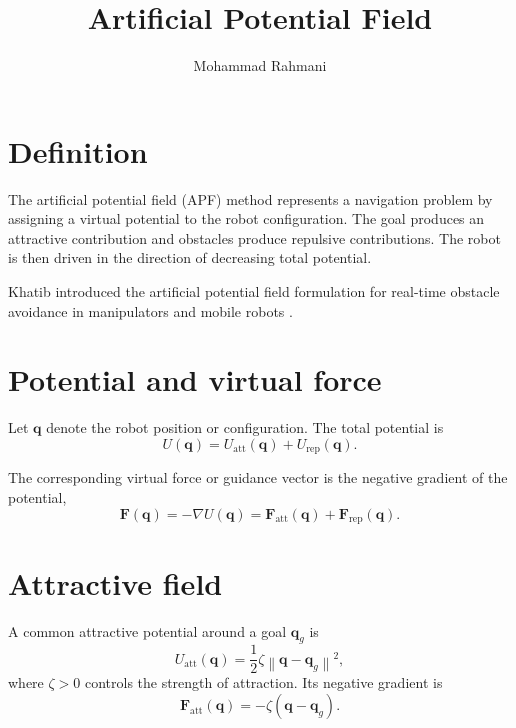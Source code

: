 \documentclass[a4paper]{article}
\title{Artificial Potential Field}
\date{}
\author{Mohammad Rahmani}
\begin{document}
   \maketitle

   \section{Definition}
      The artificial potential field (APF) method represents a navigation problem by assigning a virtual potential to the robot configuration. The goal produces an attractive contribution and obstacles produce repulsive contributions. The robot is then driven in the direction of decreasing total potential.

      Khatib introduced the artificial potential field formulation for real-time obstacle avoidance in manipulators and mobile robots \cite{khatib-1986-real-time-obstacle-avoidance}.

   \section{Potential and virtual force}
      Let \(\mathbf q\) denote the robot position or configuration. The total potential is
      \[
         U(\mathbf q)
         =
         U_{\mathrm{att}}(\mathbf q)
         +
         U_{\mathrm{rep}}(\mathbf q).
      \]

      The corresponding virtual force or guidance vector is the negative gradient of the potential,
      \[
         \mathbf F(\mathbf q)
         =
         -\nabla U(\mathbf q)
         =
         \mathbf F_{\mathrm{att}}(\mathbf q)
         +
         \mathbf F_{\mathrm{rep}}(\mathbf q).
      \]

   \section{Attractive field}
      A common attractive potential around a goal \(\mathbf q_g\) is
      \[
         U_{\mathrm{att}}(\mathbf q)
         =
         \frac{1}{2}\zeta
         \left\|
            \mathbf q-\mathbf q_g
         \right\|^2,
      \]
      where \(\zeta>0\) controls the strength of attraction. Its negative gradient is
      \[
         \mathbf F_{\mathrm{att}}(\mathbf q)
         =
         -\zeta
         \left(
            \mathbf q-\mathbf q_g
         \right).
      \]
\end{document}
